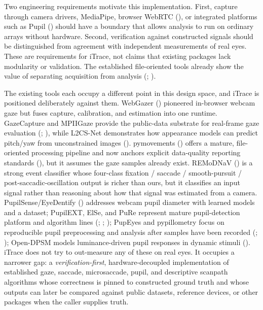 \documentclass[
]{article}
\begin{document}
Two engineering requirements motivate this implementation. First,
capture through camera drivers, MediaPipe, browser WebRTC
(), or
integrated platforms such as Pupil
() should have a
boundary that allows analysis to run on ordinary arrays without
hardware. Second, verification against constructed signals should be
distinguished from agreement with independent measurements of real eyes.
These are requirements for iTrace, not claims that existing packages
lack modularity or validation. The established file-oriented tools
already show the value of separating acquisition from analysis
(;
).

The existing tools each occupy a different point in this design space,
and iTrace is positioned deliberately against them. WebGazer
()
pioneered in-browser webcam gaze but fuses capture, calibration, and
estimation into one runtime. GazeCapture and MPIIGaze provide the
public-data substrate for real-frame gaze evaluation
(;
), while L2CS-Net
demonstrates how appearance models can predict pitch/yaw from
unconstrained images (). pymovements () offers a mature, file-oriented processing pipeline and now
anchors explicit data-quality reporting standards
(), but it assumes
the gaze samples already exist. REMoDNaV
() is a strong event
classifier whose four-class fixation / saccade / smooth-pursuit /
post-saccadic-oscillation output is richer than ours, but it classifies
an input signal rather than reasoning about how that signal was
estimated from a camera. PupilSense/EyeDentify
() addresses webcam
pupil diameter with learned models and a dataset; PupilEXT, ElSe, and
PuRe represent mature pupil-detection platform and algorithm lines
(;
;
); PupEyes and
pypillometry focus on reproducible pupil preprocessing and analysis
after samples have been recorded (; ); Open-DPSM models luminance-driven pupil responses in dynamic
stimuli (). iTrace does
not try to out-measure any of these on real eyes. It occupies a narrower
gap: a \emph{verification-first}, hardware-decoupled implementation of
established gaze, saccade, microsaccade, pupil, and descriptive scanpath
algorithms whose correctness is pinned to constructed ground truth and
whose outputs can later be compared against public datasets, reference
devices, or other packages when the caller supplies truth.
\end{document}
